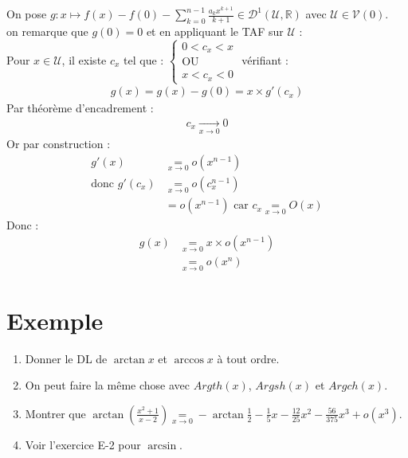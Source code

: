 \documentclass[../main.tex]{subfiles}
\begin{document}
\noindent On pose $g:x\mapsto f(x) - f(0) - \sum\limits_{k=0}^{n-1} \frac{a_k x^{k+1}}{k+1} \in \mathcal{D}^1(\mathcal{U}, \mathbb{R})$ avec $\mathcal{U} \in \mathcal{V}(0)$. \\
on remarque que $g(0) = 0$ et en appliquant le TAF sur $\mathcal{U}$ : \\
Pour $x\in \mathcal{U}$, il existe $c_x$ tel que : $\begin{cases}
    0 < c_x < x \\
    \text{OU} \\
    x < c_x < 0
\end{cases}$ vérifiant : 
\begin{align*}
    g(x) = g(x) - g(0) = x \times g'(c_x)
\end{align*}
Par théorème d'encadrement :
\begin{align*}
    c_x \underset{x \to 0}{\longrightarrow} 0
\end{align*}
Or par construction : 
\begin{align*}
    g'(x) &\underset{x\to 0}{=} o(x^{n-1}) \\
    \text{donc } g'(c_x) &\underset{x\to 0}{=} o(c_x^{n-1}) \\
    &= o(x^{n-1}) \text{ car } c_x \underset{x\to 0}{=} O(x)
\end{align*}
Donc : 
\begin{align*}
    g(x) &\underset{x\to 0}{=} x \times o(x^{n-1}) \\
    &\underset{x\to 0}{=} o(x^n)
\end{align*}

\section{Exemple}
\begin{tcolorbox}[title=Exemple 25.72, title filled=false, colframe=darkgreen, colback=darkgreen!10!white]
    \begin{enumerate}
        \item Donner le DL de $\arctan x$ et $\arccos x$ à tout ordre. 
        \item On peut faire la même chose avec $Argth(x)$, $Argsh(x)$ et $Argch(x)$.
        \item Montrer que $\arctan \left( \frac{x^2 + 1}{x - 2} \right) \underset{x\to 0}{=} -\arctan \frac{1}{2} - \frac{1}{5}x - \frac{12}{25} x^2 - \frac{56}{375}x^3 + o(x^3)$. 
        \item Voir l'exercice E-2 pour $\arcsin$. 
    \end{enumerate}
\end{tcolorbox}
\end{document}

